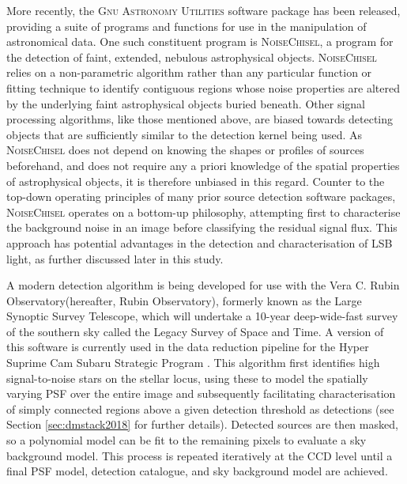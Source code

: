 \documentclass[fleqn,usenatbib,useAMS]{mnras}
\newcommand*{\Gnuastro}{\textsc{Gnuastro}\xspace}
\newcommand*{\NoiseChisel}{\textsc{NoiseChisel}\xspace}
\newcommand*{\VRO}{Vera C. Rubin Observatory\xspace}
\newcommand*{\RO}{Rubin Observatory\xspace}
\newcommand*{\LSST}{Legacy Survey of Space and Time\xspace}
\begin{document}
More recently, the \textsc{Gnu Astronomy Utilities} \citep[\Gnuastro;][]{Akhlaghi2015} software package has been released, providing a suite of programs and functions for use in the manipulation of astronomical data. One such constituent program is \NoiseChisel, a program for the detection of faint, extended, nebulous astrophysical objects. \NoiseChisel relies on a non-parametric algorithm rather than any particular function or fitting technique to identify contiguous regions whose noise properties are altered by the underlying faint astrophysical objects buried beneath. Other signal processing algorithms, like those mentioned above, are biased towards detecting objects that are sufficiently similar to the detection kernel being used. As \NoiseChisel does not depend on knowing the shapes or profiles of sources beforehand, and does not require any a priori knowledge of the spatial properties of astrophysical objects, it is therefore unbiased in this regard. Counter to the top-down operating principles of many prior source detection software packages, \NoiseChisel operates on a bottom-up philosophy, attempting first to characterise the background noise in an image before classifying the residual signal flux. This approach has potential advantages in the detection and characterisation of LSB light, as further discussed later in this study. 

A modern detection algorithm is being developed for use with the \VRO (hereafter, \RO), formerly known as the Large Synoptic Survey Telescope, which will undertake a 10-year deep-wide-fast survey of the southern sky called the \LSST \citep[LSST,][]{Ivezic2019}. A version of this software is currently used in the data reduction pipeline for the Hyper Suprime Cam Subaru Strategic Program \citep[HSC-SSP;][]{Aihara2018a,Aihara2018b,Bosch2018,Bosch2019}. This algorithm first identifies high signal-to-noise stars on the stellar locus, using these to model the spatially varying PSF over the entire image and subsequently facilitating characterisation of simply connected regions above a given detection threshold as detections (see Section \ref{sec:dmstack2018} for further details). Detected sources are then masked, so a polynomial model can be fit to the remaining pixels to evaluate a sky background model. This process is repeated iteratively at the CCD level until a final PSF model, detection catalogue, and sky background model are achieved. 
\end{document}
